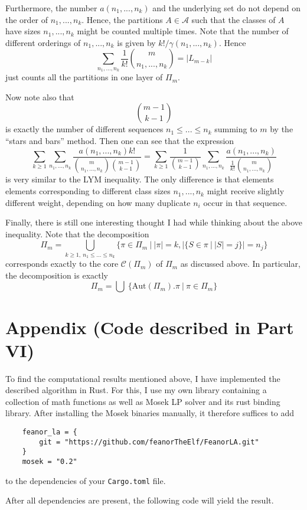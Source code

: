 \documentclass{scrartcl}
\theoremstyle{definition}
\begin{document}
Furthermore, the number $a(n_1, ..., n_k)$ and the underlying set do not depend on the order of $n_1, ..., n_k$.
Hence, the partitions $A \in \mathcal{A}$ such that the classes of $A$ have sizes $n_1, ..., n_k$ might be counted multiple times.
Note that the number of different orderings of $n_1, ..., n_k$ is given by $k!/\gamma(n_1, ..., n_k)$.
Hence
\begin{equation*}
    \sum_{n_1, ..., n_k} \frac 1 {k!} {m \choose n_1, ..., n_k} = |L_{m - k}|
\end{equation*}
just counts all the partitions in one layer of $\Pi_m$.

Now note also that
\begin{equation*}
    {m - 1 \choose k - 1}
\end{equation*}
is exactly the number of different sequences $n_1 \leq ... \leq n_k$ summing to $m$ by the ``stars and bars'' method.
Then one can see that the expression
\begin{equation*}    
    \sum_{k \geq 1} \sum_{n_1, ..., n_k} \frac {a(n_1, ..., n_k) k!} {{m \choose n_1, ..., n_k} {m - 1 \choose k - 1}} = \sum_{k \geq 1} \frac 1 {{m - 1 \choose k - 1}} \sum_{n_1, ..., n_k} \frac {a(n_1, ..., n_k)} {\frac 1 {k!} {m \choose n_1, ..., n_k}}
\end{equation*}
is very similar to the LYM inequality.
The only difference is that elements elements corresponding to different class sizes $n_1, ..., n_k$ might receive slightly different weight, depending on how many duplicate $n_i$ occur in that sequence.

Finally, there is still one interesting thought I had while thinking about the above inequality.
Note that the decomposition
\begin{equation*}
    \Pi_m = \bigcup_{k \geq 1, \ n_1 \leq ... \leq n_k} \{ \pi \in \Pi_m \ | \ |\pi| = k, |\{ S \in \pi \ | \ |S| = j \}| = n_j \}
\end{equation*}
corresponds exactly to the core $\mathcal{C}(\Pi_m)$ of $\Pi_m$ as discussed above.
In particular, the decomposition is exactly
\begin{equation*}
    \Pi_m = \bigcup \ \{ \mathrm{Aut}(\Pi_m).\pi \ | \ \pi \in \Pi_m \}
\end{equation*}

\section{Appendix (Code described in Part VI)}
To find the computational results mentioned above, I have implemented the described algorithm in Rust.
For this, I use my own library containing a collection of math functions as well as Mosek LP solver \cite{mosek} and its rust binding library.
After installing the Mosek binaries manually, it therefore suffices to add
\begin{lstlisting}
    feanor_la = { 
        git = "https://github.com/feanorTheElf/FeanorLA.git"  
    }
    mosek = "0.2"
\end{lstlisting}
to the dependencies of your \texttt{Cargo.toml} file.

After all dependencies are present, the following code will yield the result.


\printbibliography
\end{document}
